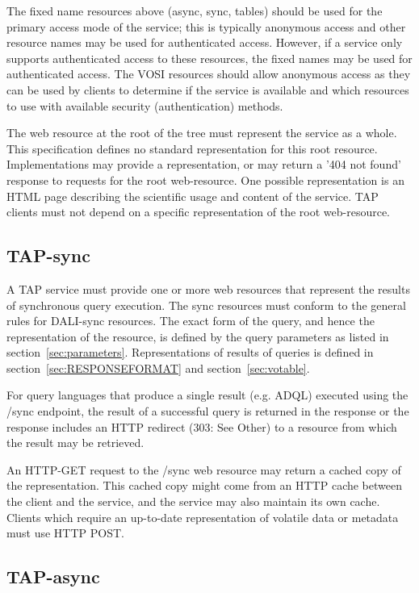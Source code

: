 \documentclass[11pt,letter]{ivoa}
\begin{document}
The fixed name resources above (async, sync, tables) should be used for the 
primary access mode of the service; this is typically anonymous access and 
other resource names may be used for authenticated access. However, if a 
service only supports authenticated access to these resources, the fixed names 
may be used for authenticated access. The VOSI resources should allow anonymous 
access as they can be used by clients to determine if the service is available 
and which resources to use with available security (authentication) methods. 

The web resource at the root of the tree must represent the service as a whole. 
This specification defines no standard representation for this root resource. 
Implementations may provide a representation, or may return a '404 not found' 
response to requests for the root web-resource. One possible representation is 
an HTML page describing the scientific usage and content of the service. TAP 
clients must not depend on a specific representation of the root web-resource.

\subsection{TAP-sync}
\label{sec:tap-sync}

A TAP service must provide one or more web resources that represent the results 
of synchronous query execution. The {sync} resources must conform to the general rules for
DALI-sync  resources. The exact form of the query, and hence the 
representation of the resource, is defined by the  query parameters as listed in 
section~\ref{sec:parameters}. Representations of results of queries is defined in 
section~\ref{sec:RESPONSEFORMAT} and section~\ref{sec:votable}.

For query languages that produce a single result (e.g. ADQL) executed using the 
/sync endpoint, the result of a successful query is returned in the response or 
the response includes an HTTP redirect (303: See Other) to a resource from 
which the result may be retrieved.

An HTTP-GET request to the /sync web resource may return a cached copy of the 
representation. This cached copy might come from an HTTP cache between the 
client and the service, and the service may also maintain its own cache. Clients 
which require an up-to-date representation of volatile data or metadata must use 
HTTP POST.

\subsection{TAP-async}
\label{sec:tap-async}
\end{document}
